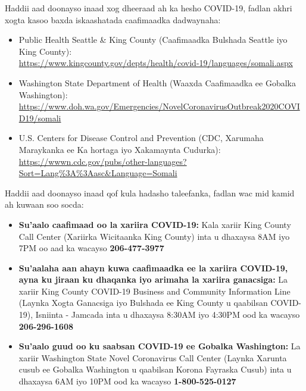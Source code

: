\documentclass[10pt]{article}
\begin{document}
Haddii aad doonayso inaad xog dheeraad ah ka hesho COVID-19, fadlan akhri xogta
kasoo baxda iskaashatada caafimaadka dadwaynaha:

\begin{itemize}
\item
  Public Health \textemdash Seattle \& King County (Caafimaadka Bulshada
  \textemdash Seattle iyo King County):\\
  \url{https://www.kingcounty.gov/depts/health/covid-19/languages/somali.aspx}

\item

  Washington State Department of Health (Waaxda Caafimaadka ee Gobalka Washington):\\
  \url{https://www.doh.wa.gov/Emergencies/NovelCoronavirusOutbreak2020COVID19/somali}

\item
  U.S. Centers for Disease Control and Prevention (CDC, Xarumaha Maraykanka ee
  Ka hortaga iyo Xakamaynta Cudurka):\\
  \url{https://wwwn.cdc.gov/pubs/other-languages?Sort=Lang%3A%3Aasc&Language=Somali}

\end{itemize}

Haddii aad doonayso inaad qof kula hadasho taleefanka, fadlan wac mid kamid ah
kuwaan soo socda:

\begin{itemize}

\item

  \textbf{Su'aalo caafimaad oo la xariira COVID-19:} Kala xariir King County
  Call Center (Xariirka Wicitaanka King County) inta u dhaxaysa 8AM iyo 7PM oo
  aad ka wacayso \textbf{206-477-3977}

\item

  \textbf{Su'aalaha aan ahayn kuwa caafimaadka ee la xariira COVID-19, ayna ku
  jiraan ku dhaqanka iyo arimaha la xariira ganacsiga:} La xariir King County
  COVID-19 Business and Community Information Line (Laynka Xogta Ganacsiga iyo
  Bulshada ee King County u qaabilsan COVID-19), Isniinta - Jamcada inta u
  dhaxaysa 8:30AM iyo 4:30PM ood ka wacayso \textbf{206-296-1608}

\item

  \textbf{Su'aalo guud oo ku saabsan COVID-19 ee Gobalka Washington:} La xariir
  Washington State Novel Coronavirus Call Center (Laynka Xarunta cusub ee
  Gobalka Washington u qaabilsan Korona Fayraska Cusub) inta u dhaxaysa 6AM iyo
  10PM ood ka wacayso \textbf{1-800-525-0127}

\end{itemize}
\end{document}
